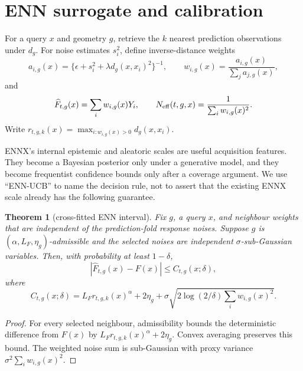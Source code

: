 \documentclass[11pt]{article}
\newtheorem{theorem}{Theorem}
\theoremstyle{definition}
\theoremstyle{remark}
\newcommand{\1}{\mathbf 1}
\begin{document}
\section{ENN surrogate and calibration}

For a query $x$ and geometry $g$, retrieve the $k$ nearest prediction observations under $d_g$.
For noise estimates $s_i^2$, define inverse-distance weights
\begin{equation}\label{eq:enn-weights}
  a_{i,g}(x)=\{\epsilon+s_i^2+\lambda d_g(x,x_i)^2\}^{-1},
  \qquad
  w_{i,g}(x)=\frac{a_{i,g}(x)}{\sum_j a_{j,g}(x)},
\end{equation}
and
\begin{equation}\label{eq:enn-predictor}
  \widehat F_{t,g}(x)=\sum_i w_{i,g}(x)Y_i,
  \qquad
  N_{\rm eff}(t,g,x)=\frac{1}{\sum_iw_{i,g}(x)^2}.
\end{equation}
Write $r_{t,g,k}(x)=\max_{i:w_{i,g}(x)>0}d_g(x,x_i)$.

ENNX's internal epistemic and aleatoric scales are useful acquisition features.  They become a
Bayesian posterior only under a generative model, and they become frequentist confidence bounds only
after a coverage argument.  We use ``ENN-UCB'' to name the decision rule, not to assert that the
existing ENNX scale already has the following guarantee.

\begin{theorem}[cross-fitted ENN interval]\label{thm:enn-interval}
Fix $g$, a query $x$, and neighbour weights that are independent of the prediction-fold response
noises.  Suppose $g$ is $(\alpha,L_F,\eta_g)$-admissible and the selected noises are independent
$\sigma$-sub-Gaussian variables.  Then, with probability at least $1-\delta$,
\begin{equation}\label{eq:enn-radius}
  |\widehat F_{t,g}(x)-F(x)|\le C_{t,g}(x;\delta),
\end{equation}
where
\begin{equation}\label{eq:confidence-radius}
  C_{t,g}(x;\delta)=
  L_F r_{t,g,k}(x)^\alpha+2\eta_g+
  \sigma\sqrt{2\log(2/\delta)\sum_iw_{i,g}(x)^2}.
\end{equation}
\end{theorem}
\begin{proof}
For every selected neighbour, admissibility bounds the deterministic difference from $F(x)$ by
$L_Fr_{t,g,k}(x)^\alpha+2\eta_g$.  Convex averaging preserves this bound.  The weighted noise sum
is sub-Gaussian with proxy variance $\sigma^2\sum_iw_{i,g}(x)^2$.
\end{proof}
\end{document}

